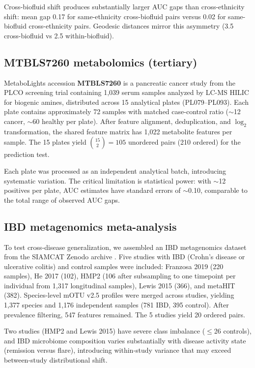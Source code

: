 \documentclass[11pt]{article}
\begin{document}
Cross-biofluid shift produces substantially larger AUC gaps than cross-ethnicity shift: mean gap 0.17 for same-ethnicity cross-biofluid pairs versus 0.02 for same-biofluid cross-ethnicity pairs. Geodesic distances mirror this asymmetry (3.5 cross-biofluid vs 2.5 within-biofluid).

\subsection{MTBLS7260 metabolomics (tertiary)}
\label{sec:metab_data}

MetaboLights accession \textbf{MTBLS7260} \citep{leonletelier2024contributions} is a pancreatic cancer study from the PLCO screening trial containing 1{,}039 serum samples analyzed by LC-MS HILIC for biogenic amines, distributed across 15 analytical plates (PL079--PL093). Each plate contains approximately 72 samples with matched case-control ratio ($\sim$12 cancer, $\sim$60 healthy per plate). After feature alignment, deduplication, and $\log_2$ transformation, the shared feature matrix has 1{,}022 metabolite features per sample. The 15 plates yield $\binom{15}{2} = 105$ unordered pairs (210 ordered) for the prediction test.

Each plate was processed as an independent analytical batch, introducing systematic variation. The critical limitation is statistical power: with $\sim$12 positives per plate, AUC estimates have standard errors of $\sim$0.10, comparable to the total range of observed AUC gaps.

\subsection{IBD metagenomics meta-analysis}
\label{sec:ibd_data}

To test cross-disease generalization, we assembled an IBD metagenomics dataset from the SIAMCAT Zenodo archive \citep{wirbel2021siamcat}. Five studies with IBD (Crohn's disease or ulcerative colitis) and control samples were included: Franzosa 2019 (220 samples), He 2017 (102), HMP2 (106 after subsampling to one timepoint per individual from 1{,}317 longitudinal samples), Lewis 2015 (366), and metaHIT (382). Species-level mOTU v2.5 profiles were merged across studies, yielding 1{,}377 species and 1{,}176 independent samples (781 IBD, 395 control). After prevalence filtering, 547 features remained. The 5 studies yield 20 ordered pairs.

Two studies (HMP2 and Lewis 2015) have severe class imbalance ($\leq$26 controls), and IBD microbiome composition varies substantially with disease activity state (remission versus flare), introducing within-study variance that may exceed between-study distributional shift.
\end{document}
